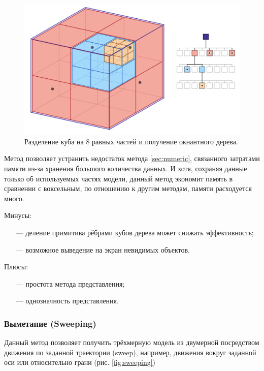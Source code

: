 \begin{figure}[h]
	\centering
	\includegraphics[width=\textwidth]{img/octTree.png}
	\caption{Разделение куба на 8 равных частей и получение 
		окнантного дерева.}
	\label{fig:octTree}
\end{figure}

Метод позволяет устранить недостаток метода \ref{sec:numeric}, 
связанного затратами памяти из-за хранения большого количества данных.
И хотя, сохраняя данные только об используемых частях модели, данный метод экономит память в сравнении с воксельным, по отношению к другим методам, 
памяти расходуется много.

Минусы:
\begin{itemize}[leftmargin=1.6\parindent]
	\item[---] деление примитива рёбрами кубов дерева может снижать 
	эффективность;
	\item[---] возможное выведение на экран невидимых объектов.
\end{itemize}

Плюсы:
\begin{itemize}[leftmargin=1.6\parindent]
	\item[---] простота метода представления;
	\item[---] однозначность представления.
\end{itemize}


\subsubsection{Выметание (Sweeping)}

Данный метод позволяет получить трёхмерную модель из двумерной 
посредством движения по заданной траектории (sweep), например, движения 
вокруг заданной оси или относительно грани (рис. \ref{fig:sweeping})

